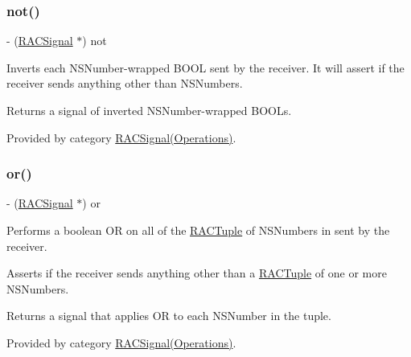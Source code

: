 \subsubsection{\texorpdfstring{not()}{not()}\hspace{0.1cm}{\footnotesize\ttfamily [3/3]}}
{\footnotesize\ttfamily -\/ (\mbox{\hyperlink{interface_r_a_c_signal}{R\+A\+C\+Signal}} $\ast$) not \begin{DoxyParamCaption}{ }\end{DoxyParamCaption}}

Inverts each N\+S\+Number-\/wrapped B\+O\+OL sent by the receiver. It will assert if the receiver sends anything other than N\+S\+Numbers.

Returns a signal of inverted N\+S\+Number-\/wrapped B\+O\+O\+Ls. 

Provided by category \mbox{\hyperlink{category_r_a_c_signal_07_operations_08_a53de1c418b57ee4c60d20f561db04717}{R\+A\+C\+Signal(\+Operations)}}.

\mbox{\label{interface_r_a_c_signal_aaf19b8314c8e554a7e5140ebffcd4f98}} 
\subsubsection{\texorpdfstring{or()}{or()}\hspace{0.1cm}{\footnotesize\ttfamily [1/3]}}
{\footnotesize\ttfamily -\/ (\mbox{\hyperlink{interface_r_a_c_signal}{R\+A\+C\+Signal}} $\ast$) or \begin{DoxyParamCaption}{ }\end{DoxyParamCaption}}

Performs a boolean OR on all of the \mbox{\hyperlink{interface_r_a_c_tuple}{R\+A\+C\+Tuple}} of N\+S\+Numbers in sent by the receiver.

Asserts if the receiver sends anything other than a \mbox{\hyperlink{interface_r_a_c_tuple}{R\+A\+C\+Tuple}} of one or more N\+S\+Numbers.

Returns a signal that applies OR to each N\+S\+Number in the tuple. 

Provided by category \mbox{\hyperlink{category_r_a_c_signal_07_operations_08_aaf19b8314c8e554a7e5140ebffcd4f98}{R\+A\+C\+Signal(\+Operations)}}.

\mbox{\label{interface_r_a_c_signal_aaf19b8314c8e554a7e5140ebffcd4f98}} 
